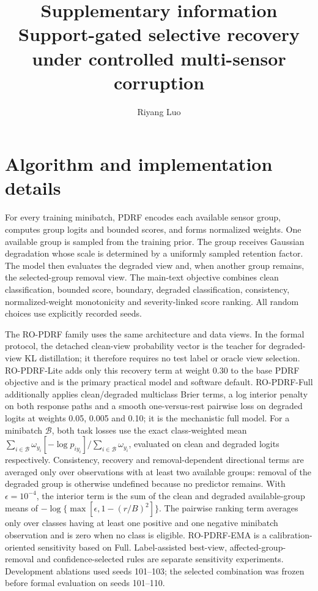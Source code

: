 \documentclass[10pt]{article}
\title{Supplementary information\\Support-gated selective recovery under controlled multi-sensor corruption}
\author{Riyang Luo}
\date{}
\begin{document}
\maketitle

\section{Algorithm and implementation details}

For every training minibatch, PDRF encodes each available sensor group, computes group logits and bounded scores, and forms normalized weights. One available group is sampled from the training prior. The group receives Gaussian degradation whose scale is determined by a uniformly sampled retention factor. The model then evaluates the degraded view and, when another group remains, the selected-group removal view. The main-text objective combines clean classification, bounded score, boundary, degraded classification, consistency, normalized-weight monotonicity and severity-linked score ranking. All random choices use explicitly recorded seeds.

The RO-PDRF family uses the same architecture and data views. In the formal protocol, the detached clean-view probability vector is the teacher for degraded-view KL distillation; it therefore requires no test label or oracle view selection. RO-PDRF-Lite adds only this recovery term at weight 0.30 to the base PDRF objective and is the primary practical model and software default. RO-PDRF-Full additionally applies clean/degraded multiclass Brier terms, a log interior penalty on both response paths and a smooth one-versus-rest pairwise loss on degraded logits at weights 0.05, 0.005 and 0.10; it is the mechanistic full model. For a minibatch $\mathcal B$, both task losses use the exact class-weighted mean $\sum_{i\in\mathcal B}\omega_{y_i}[-\log p_{iy_i}]/\sum_{i\in\mathcal B}\omega_{y_i}$, evaluated on clean and degraded logits respectively. Consistency, recovery and removal-dependent directional terms are averaged only over observations with at least two available groups: removal of the degraded group is otherwise undefined because no predictor remains. With $\epsilon=10^{-4}$, the interior term is the sum of the clean and degraded available-group means of $-\log\{\max[\epsilon,1-(r/B)^2]\}$. The pairwise ranking term averages only over classes having at least one positive and one negative minibatch observation and is zero when no class is eligible. RO-PDRF-EMA is a calibration-oriented sensitivity based on Full. Label-assisted best-view, affected-group-removal and confidence-selected rules are separate sensitivity experiments. Development ablations used seeds 101--103; the selected combination was frozen before formal evaluation on seeds 101--110.
\end{document}
